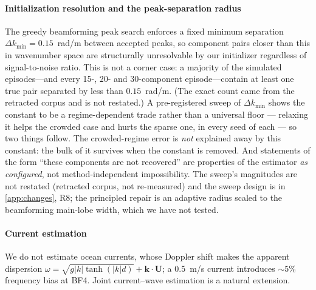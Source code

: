\documentclass[review]{elsarticle}
\begin{document}
\paragraph{Initialization resolution and the peak-separation radius}
The greedy
beamforming peak search enforces a fixed minimum separation
$\Delta k_{\min}=0.15$~rad/m between accepted peaks, so component pairs closer
than this in wavenumber space are structurally unresolvable by our initializer
regardless of signal-to-noise ratio.  This is not a corner case: a majority of the
simulated episodes---and every 15-, 20- and 30-component episode---contain at
least one true pair separated by less than $0.15$~rad/m. (The exact count came from
the retracted corpus and is not restated.)  A pre-registered sweep of
$\Delta k_{\min}$ shows the constant to be a regime-dependent trade rather than a
universal floor --- relaxing it helps the crowded case and hurts the sparse one, in
every seed of each --- so two things follow. The crowded-regime error is \emph{not}
explained away by this constant: the bulk of it survives when the constant is
removed. And statements of the form ``these components are not recovered'' are
properties of the estimator \emph{as configured}, not method-independent
impossibility. The sweep's magnitudes are not restated (retracted corpus, not
re-measured) and the sweep design is in \ref{app:changes}, R8; the principled repair
is an adaptive radius scaled to the beamforming main-lobe width, which we have not
tested.

\paragraph{Current estimation}
We do not estimate ocean currents, whose
Doppler shift makes the apparent dispersion
$\omega=\sqrt{g|k|\tanh(|k|d)}+\mathbf{k}\cdot\mathbf{U}$; a
0.5~m/s current introduces ${\sim}5\%$ frequency bias at BF4.
Joint current--wave estimation is a natural extension.
\end{document}
